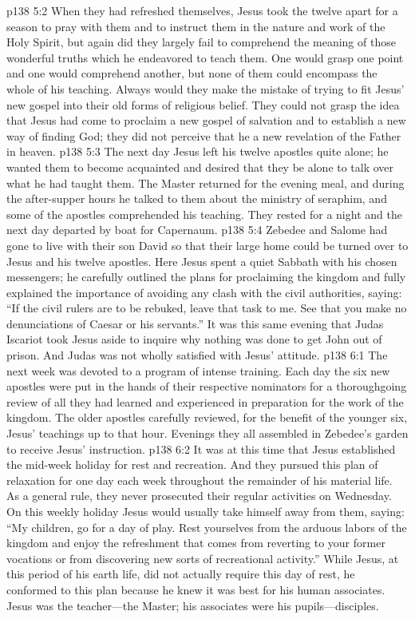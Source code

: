 \pc \vs p138 5:2 When they had refreshed themselves, Jesus took the twelve apart for a season to pray with them and to instruct them in the nature and work of the Holy Spirit, but again did they largely fail to comprehend the meaning of those wonderful truths which he endeavored to teach them. One would grasp one point and one would comprehend another, but none of them could encompass the whole of his teaching. Always would they make the mistake of trying to fit Jesus’ new gospel into their old forms of religious belief. They could not grasp the idea that Jesus had come to proclaim a new gospel of salvation and to establish a new way of finding God; they did not perceive that he  a new revelation of the Father in heaven.
\vs p138 5:3 The next day Jesus left his twelve apostles quite alone; he wanted them to become acquainted and desired that they be alone to talk over what he had taught them. The Master returned for the evening meal, and during the after\hyp{}supper hours he talked to them about the ministry of seraphim, and some of the apostles comprehended his teaching. They rested for a night and the next day departed by boat for Capernaum.
\vs p138 5:4 Zebedee and Salome had gone to live with their son David so that their large home could be turned over to Jesus and his twelve apostles. Here Jesus spent a quiet Sabbath with his chosen messengers; he carefully outlined the plans for proclaiming the kingdom and fully explained the importance of avoiding any clash with the civil authorities, saying: \textcolor{ubdarkred}{“If the civil rulers are to be rebuked, leave that task to me. See that you make no denunciations of Caesar or his servants.”} It was this same evening that Judas Iscariot took Jesus aside to inquire why nothing was done to get John out of prison. And Judas was not wholly satisfied with Jesus’ attitude.
\vs p138 6:1 The next week was devoted to a program of intense training. Each day the six new apostles were put in the hands of their respective nominators for a thoroughgoing review of all they had learned and experienced in preparation for the work of the kingdom. The older apostles carefully reviewed, for the benefit of the younger six, Jesus’ teachings up to that hour. Evenings they all assembled in Zebedee’s garden to receive Jesus’ instruction.
\vs p138 6:2 It was at this time that Jesus established the mid\hyp{}week holiday for rest and recreation. And they pursued this plan of relaxation for one day each week throughout the remainder of his material life. As a general rule, they never prosecuted their regular activities on Wednesday. On this weekly holiday Jesus would usually take himself away from them, saying: \textcolor{ubdarkred}{“My children, go for a day of play. Rest yourselves from the arduous labors of the kingdom and enjoy the refreshment that comes from reverting to your former vocations or from discovering new sorts of recreational activity.”} While Jesus, at this period of his earth life, did not actually require this day of rest, he conformed to this plan because he knew it was best for his human associates. Jesus was the teacher---the Master; his associates were his pupils---disciples.
